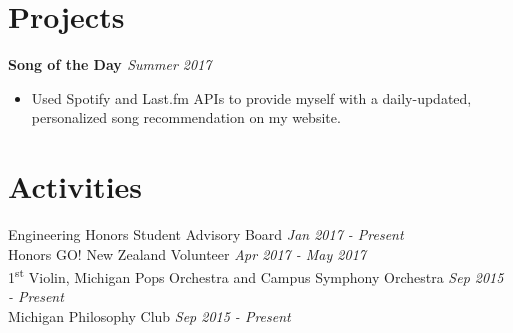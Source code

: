 \documentclass[margin,line]{resume}
\begin{document}
\begin{resume}
	\sectionbreak
	\vspace{-2.5mm}
	\section{\mysidestyle Projects}
	\textbf{Song of the Day \href{https://github.com/jonathoma/songoftheday}{\faGithub}}  \hfill \textsl{Summer 2017} \vspace{1mm}%
	\begin{itemize}[leftmargin=4mm]
		\item Used Spotify and Last.fm APIs to provide myself with a daily-updated, personalized song recommendation on my website.
	\end{itemize}
	\vspace{1.5mm}
	   
	\sectionbreak
	\vspace{-2.5mm}
	\section{\mysidestyle Activities}
	\begin{flushright}
		\vspace{-7.5mm}
		Engineering Honors Student Advisory Board	\hfill  \textsl{Jan 2017 - Present} \\
		Honors GO! New Zealand Volunteer \hfill \textsl{Apr 2017 - May 2017} \\
		1\textsuperscript{st} Violin, Michigan Pops Orchestra and Campus Symphony Orchestra \hfill \textsl{Sep 2015 - Present}\\
		Michigan Philosophy Club \hfill \textsl{Sep 2015 - Present}
	\end{flushright}
	\vspace{-1.5mm}
	    

\end{resume}
\end{document}
